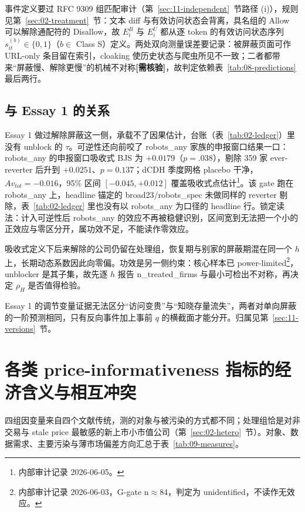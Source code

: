 \documentclass[a4paper,11pt]{ctexart}
\begin{document}
事件定义要过 RFC 9309 组匹配审计（第~\ref{sec:11-independent}~节路径 (i)），规则见第~\ref{sec:02-treatment}~节：文本 diff 与有效访问状态会背离，具名组的 Allow 可以解除通配符的 Disallow，故 $E^{B}_i$ 与 $E^{U}_i$ 都从逐 token 的有效访问状态序列 $s^{(b)}_{it}\in\{0,1\}$（$b\in$ Class S）定义。两处双向测量误差要记录：被屏蔽页面可作 URL-only 条目留在索引，cloaking 使历史状态与爬虫所见不一致；二者都带来“屏蔽慢、解除更慢”的机械不对称\textbf{[需核验]}，故判定依赖表~\ref{tab:08-predictions} 最后两行。

\subsection{与 Essay 1 的关系}\label{sec:08-essay1}

Essay 1 做过解除屏蔽这一侧，承载不了因果估计，台账（表~\ref{tab:02-ledger}）里没有 unblock 的 $\tau$。可逆性还向前咬了 robots\_any 家族的申报窗口结果一口：robots\_any 的申报窗口吸收式 BJS 为 $+0.0179$（$p=.038$），剔除 359 家 ever-reverter 后升到 $+0.0251$、$p=0.137$；dCDH 季度网格 placebo 干净，$Av_{tot}=-0.016$，95\% 区间 $[-0.045,+0.012]$ 覆盖吸收式点估计\footnote{内部审计记录 2026-06-05。}。该 gate 跑在 robots\_any 上，headline 锚定的 broad23/robots\_spec 未做同样的 reverter 剔除，表~\ref{tab:02-ledger} 里也没有以 robots\_any 为口径的 headline 行。锁定读法：计入可逆性后 robots\_any 的效应不再被稳健识别，区间宽到无法把一个小的正效应与零区分开，属功效不足，不能读作零效应。

吸收式定义下后来解除的公司仍留在处理组，恢复期与别家的屏蔽期混在同一个 $h$ 上，长期动态系数因此向零偏。功效是另一侧约束：核心样本已 power-limited\footnote{内部审计记录 2026-06-03，G-gate n$\approx$84，判定为 unidentified，不读作无效应。}，unblocker 是其子集，故先逐 $h$ 报告 n\_treated\_firms 与最小可检出不对称，再决定 $\rho_H$ 是否值得检验。

Essay 1 的调节变量证据无法区分“访问变贵”与“知晓存量流失”，两者对单向屏蔽的一阶预测相同，只有反向事件加上事前 $q$ 的横截面才能分开。归属见第~\ref{sec:11-versions}~节。
\clearpage

\section{各类 price-informativeness 指标的经济含义与相互冲突}\label{sec:09-measures}

四组因变量来自四个文献传统，测的对象与被污染的方式都不同；处理组恰是对非交易与 stale price 最敏感的新上市小市值公司（第~\ref{sec:02-hetero}~节）。对象、数据需求、主要污染与薄市场偏差方向汇总于表~\ref{tab:09-measures}。
\end{document}

